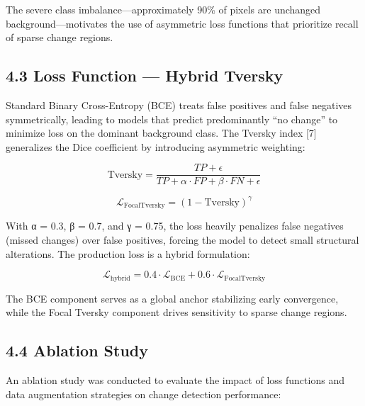 \documentclass[11pt,a4paper]{article}
\begin{document}
The severe class imbalance---approximately 90\% of pixels are unchanged background---motivates the use of asymmetric loss functions that prioritize recall of sparse change regions.

\hypertarget{loss-function-hybrid-tversky}{%
\subsection{4.3 Loss Function --- Hybrid Tversky}\label{loss-function-hybrid-tversky}}

Standard Binary Cross-Entropy (BCE) treats false positives and false negatives symmetrically, leading to models that predict predominantly ``no change'' to minimize loss on the dominant background class. The Tversky index [7] generalizes the Dice coefficient by introducing asymmetric weighting:

\[\text{Tversky} = \frac{TP + \epsilon}{TP + \alpha \cdot FP + \beta \cdot FN + \epsilon} \tag{2}\]

\[\mathcal{L}_{\text{FocalTversky}} = (1 - \text{Tversky})^\gamma \tag{3}\]

With α = 0.3, β = 0.7, and γ = 0.75, the loss heavily penalizes false negatives (missed changes) over false positives, forcing the model to detect small structural alterations. The production loss is a hybrid formulation:

\[\mathcal{L}_{\text{hybrid}} = 0.4 \cdot \mathcal{L}_{\text{BCE}} + 0.6 \cdot \mathcal{L}_{\text{FocalTversky}} \tag{4}\]

The BCE component serves as a global anchor stabilizing early convergence, while the Focal Tversky component drives sensitivity to sparse change regions.

\hypertarget{ablation-study}{%
\subsection{4.4 Ablation Study}\label{ablation-study}}

An ablation study was conducted to evaluate the impact of loss functions and data augmentation strategies on change detection performance:
\end{document}
